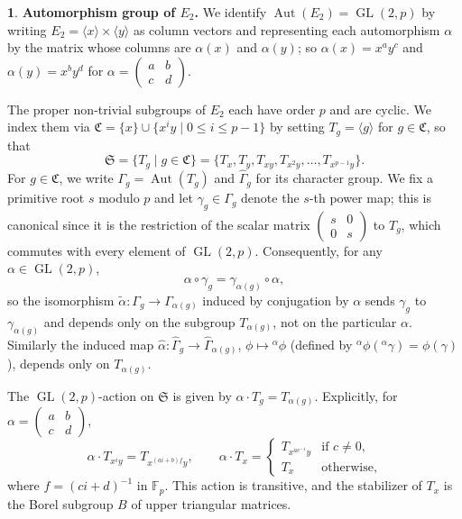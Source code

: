 \documentclass[12pt]{article}
\theoremstyle{plain}
\theoremstyle{definition}
\newtheorem{nothing}[theorem]{}
\newcommand{\Aut}{\operatorname{Aut}}
\newcommand{\gl}{{\operatorname{GL}(2, p)}}
\begin{document}
\begin{nothing} {\textbf{Automorphism group of $E_2$.}}
We identify $\Aut(E_2) = \gl$ by writing $E_2 = \langle x\rangle \times \langle y\rangle$ as column vectors and representing each automorphism $\alpha$ by the matrix whose columns are $\alpha(x)$ and $\alpha(y)$; so $\alpha(x) = x^ay^c$ and $\alpha(y) = x^by^d$ for $\alpha = \begin{pmatrix} a & b \\ c & d \end{pmatrix}$.

The proper non-trivial subgroups of $E_2$ each have order $p$ and are cyclic. We index them via $\mathfrak C = \{x\} \cup \{x^iy \mid 0 \le i \le p-1\}$ by setting $T_g = \langle g\rangle$ for $g \in \mathfrak C$, so that
\[
\mathfrak S = \{ T_g \mid g \in \mathfrak C \} = \{ T_x, T_y, T_{xy}, T_{x^2y}, \ldots, T_{x^{p-1}y} \}.
\]
For $g\in\mathfrak C$, we write $\Gamma_g = \Aut(T_g)$ and $\hat\Gamma_g$ for its character group. We fix a primitive root $s$ modulo $p$ and let $\gamma_g \in \Gamma_g$ denote the $s$-th power map; this is canonical since it is the restriction of the scalar matrix $\begin{pmatrix} s & 0 \\ 0 & s \end{pmatrix}$ to $T_g$, which commutes with every element of $\gl$. Consequently, for any $\alpha\in\gl$,
\[
\alpha \circ \gamma_g = \gamma_{\alpha(g)} \circ \alpha,
\]
so the isomorphism $\tilde\alpha\colon \Gamma_g \to \Gamma_{\alpha(g)}$ induced by conjugation by $\alpha$ sends $\gamma_g$ to $\gamma_{\alpha(g)}$ and depends only on the subgroup $T_{\alpha(g)}$, not on the particular $\alpha$. Similarly the induced map $\hat\alpha\colon\hat\Gamma_g\to\hat\Gamma_{\alpha(g)}$, $\phi\mapsto{}^\alpha\phi$ (defined by ${}^\alpha\phi({}^\alpha\gamma)=\phi(\gamma)$), depends only on $T_{\alpha(g)}$.

The $\gl$-action on $\mathfrak S$ is given by $\alpha\cdot T_g = T_{\alpha(g)}$. Explicitly, for $\alpha = \begin{pmatrix} a & b \\ c & d \end{pmatrix}$,
\[
\alpha\cdot T_{x^iy} = T_{x^{(ai+b)f}y}, \qquad
\alpha\cdot T_x = \begin{cases} T_{x^{ac^{-1}}y} & \text{if } c\neq 0,\\ T_x & \text{otherwise,}\end{cases}
\]
where $f = (ci+d)^{-1}$ in $\mathbb F_p$. This action is transitive, and the stabilizer of $T_x$ is the Borel subgroup $B$ of upper triangular matrices.
\end{nothing}
\end{document}
